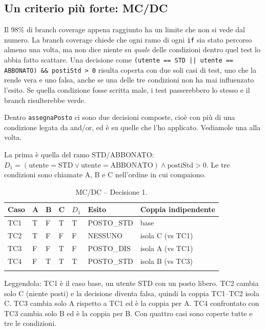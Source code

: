 

\subsection{Un criterio più forte: MC/DC}

Il 98\% di branch coverage appena raggiunto ha un limite che non si vede dal numero. La
branch coverage chiede che ogni ramo di ogni \texttt{if} sia stato percorso almeno una
volta, ma non dice niente su \emph{quale} delle condizioni dentro quel test lo abbia
fatto scattare. Una decisione come
\texttt{(utente == STD || utente == ABBONATO) \&\& postiStd > 0} risulta coperta con due
soli casi di test, uno che la rende vera e uno falsa, anche se una delle tre condizioni
non ha mai influenzato l'esito. Se quella condizione fosse scritta male, i test
passerebbero lo stesso e il branch risulterebbe verde.

Dentro \texttt{assegnaPosto} ci sono due decisioni composte, cioè con più di una
condizione legata da and/or, ed è su quelle che l'ho applicato. Vediamole una alla volta.

La prima è quella del ramo STD/ABBONATO: $D_1 = (\text{utente}{=}\text{STD}
\lor \text{utente}{=}\text{ABBONATO}) \land \text{postiStd}{>}0$. Le tre condizioni
sono chiamate A, B e C nell'ordine in cui compaiono.

\begin{longtable}{@{}p{1cm}p{0.6cm}p{0.6cm}p{0.6cm}p{0.6cm}p{2.6cm}p{5.5cm}@{}}
\toprule
Caso & A & B & C & $D_1$ & Esito & Coppia indipendente \\
\midrule
\endhead
TC1 & T & F & T & T & POSTO\_STD & base \\
TC2 & T & F & F & F & NESSUNO & isola C (vs TC1) \\
TC3 & F & F & T & F & POSTO\_DIS & isola A (vs TC1) \\
TC4 & F & T & T & T & POSTO\_STD & isola B (vs TC3) \\
\bottomrule
\caption{MC/DC -- Decisione 1.}
\label{tab:mcdc1}
\end{longtable}

Leggendola: TC1 è il caso base, un utente STD con un posto libero. TC2 cambia solo C
(niente posti) e la decisione diventa falsa, quindi la coppia TC1--TC2 isola C. TC3
cambia solo A rispetto a TC1 ed è la coppia per A. TC4 confrontato con TC3 cambia solo B
ed è la coppia per B. Con quattro casi sono coperte tutte e tre le condizioni.

